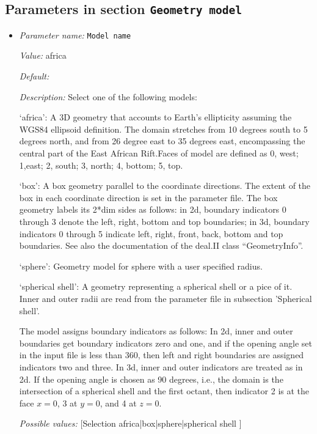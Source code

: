 \subsection{Parameters in section \tt Geometry model}
\label{parameters:Geometry_20model}

\begin{itemize}
\item {\it Parameter name:} {\tt Model name}


{\it Value:} africa


{\it Default:} 


{\it Description:} Select one of the following models:

`africa': A 3D geometry that accounts to Earth's ellipticity assuming the WGS84 ellipsoid definition. The domain stretches from 10 degrees south to 5 degrees north, and from 26 degree east to 35 degrees east, encompassing the central part of the East African Rift.Faces of model are defined as 0, west; 1,east; 2, south; 3, north; 4, bottom; 5, top.

`box': A box geometry parallel to the coordinate directions. The extent of the box in each coordinate direction is set in the parameter file. The box geometry labels its 2*dim sides as follows: in 2d, boundary indicators 0 through 3 denote the left, right, bottom and top boundaries; in 3d, boundary indicators 0 through 5 indicate left, right, front, back, bottom and top boundaries. See also the documentation of the deal.II class ``GeometryInfo''.

`sphere': Geometry model for sphere with a user specified radius.

`spherical shell': A geometry representing a spherical shell or a pice of it. Inner and outer radii are read from the parameter file in subsection 'Spherical shell'.

The model assigns boundary indicators as follows: In 2d, inner and outer boundaries get boundary indicators zero and one, and if the opening angle set in the input file is less than 360, then left and right boundaries are assigned indicators two and three. In 3d, inner and outer indicators are treated as in 2d. If the opening angle is chosen as 90 degrees, i.e., the domain is the intersection of a spherical shell and the first octant, then indicator 2 is at the face $x=0$, 3 at $y=0$, and 4 at $z=0$.


{\it Possible values:} [Selection africa|box|sphere|spherical shell ]
\end{itemize}



